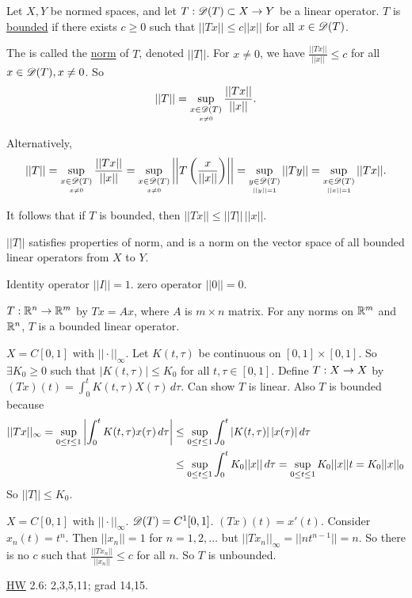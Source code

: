 \documentclass[]{article}
\begin{document}
\newpage

\begin{definition}
	Let $X,Y$ be normed spaces, and let $T:\mathscr{D}(T)\subset X\rightarrow Y$ be a linear operator.
	$T$ is \ul{bounded} if there exists $c\geq0$ such that $||Tx|| \leq c||x||$ for all $x\in\mathscr{D}(T)$.
\end{definition}
\begin{definition}
The  is called the \ul{norm} of $T$, denoted $||T||$.
For $x\neq0$, we have $\frac{||Tx||}{||x||}\leq c$ for all $x\in\mathscr{D}(T),x\neq0$.
So $$||T|| = \sup_{\underset{x\neq0}{x\in\mathscr{D}(T)}}\frac{||Tx||}{||x||}.$$
\end{definition}
Alternatively, $$ ||T|| = \sup_{\underset{x\neq0}{x\in\mathscr{D}(T)}}\frac{||Tx||}{||x||} = \sup_{\underset{x\neq0}{x\in\mathscr{D}(T)}} \left|\left|T\left(\frac x{||x||}\right)\right|\right| = \sup_{\underset{||y||=1}{y\in\mathscr{D}(T)}}||Ty|| = \sup_{\underset{||x||=1}{x\in\mathscr{D}(T)}}||Tx||.$$
\begin{note}
	It follows that if $T$ is bounded, then $||Tx|| \leq ||T||\,||x||$.
\end{note}
\begin{note}
	$||T||$ satisfies properties of  norm, and is a norm on the vector space of all bounded linear operators from $X$ to $Y$.
\end{note}
\begin{example}
	Identity operator $||I|| = 1$. zero operator $||0||=0$.
\end{example}
\begin{example}
	$T:\mathbb{R}^n\rightarrow\mathbb{R}^m$ by $Tx=Ax$, where $A$ is $m\times n$ matrix.
	For any norms on $\mathbb{R}^m$ and $\mathbb{R}^n$, $T$ is a bounded linear operator.
\end{example}
\begin{example}
	$X = C[0,1]$ with $||\cdot||_\infty$.
	Let $K(t,\tau)$ be continuous on $[0,1]\times[0,1]$. So $\exists K_0\geq 0$ such that $|K(t,\tau)|\leq K_0$ for all $t,\tau\in[0,1]$.
	Define $T:X\rightarrow X$ by $(Tx)(t) = \int_0^t K(t,\tau)X(\tau)\,d\tau$.
	Can show $T$ is linear. Also $T$ is bounded because 
	\begin{align*}
		|| Tx||_\infty = \sup_{0\leq t\leq1}\left|\int_0^t K(t,\tau)x(\tau)\,d\tau\right|
		&\leq \sup_{0\leq t\leq 1}\int_0^t |K(t,\tau)|\,|x(\tau)|\,d\tau \\
		&\leq \sup_{0\leq t\leq 1}\int_0^t K_0||x||\,d\tau
					   = \sup_{0\leq t\leq 1}K_0||x||t
					   = K_0||x||_0
	\end{align*}
	So $||T||\leq K_0$.
\end{example}
\begin{example}
	$X = C[0,1]$ with $||\cdot||_\infty$.
	$\mathscr{D}(T) = C^1[0,1]$.
	$(Tx)(t) = x'(t)$.
	Consider $x_n(t) = t^n$.
	Then $||x_n||=1$ for $n=1,2,\dots$
	but $||Tx_n||_\infty = ||nt^{n-1}||=n$.
	So there is  no $c$ such that $\frac{||Tx_n||}{||x_n||}\leq c$ for all $n$.
	So $T$ is unbounded.
\end{example}
\ul{HW} 2.6: 2,3,5,11; grad 14,15.
\end{document}
